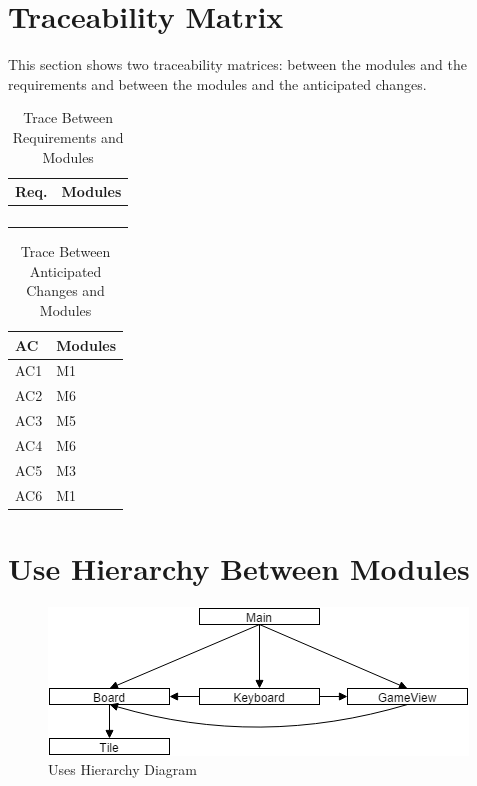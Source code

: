 \documentclass[12pt]{article}
\begin{document}
\section{Traceability Matrix}
This section shows two traceability matrices: between the modules and 
the 
requirements and between the modules and the anticipated changes. 
\smallskip
\begin{table}[!htbp]
	\centering
	\begin{tabular}{p{3cm}|p{9cm}}
		\textbf{Req.} & \textbf{Modules} \\\hline
		&  \\
		&  \\
		&  \\
		&  \\\hline
	\end{tabular}
	\caption{Trace Between Requirements and Modules}
	\label{Trace Between Requirements and Modules}
\end{table}
\begin{table}[!htbp]
	\centering
	\begin{tabular}{p{3cm}|p{9cm}}
		\textbf{AC} & \textbf{Modules} \\\hline
		AC1 & M1 \\ 
		AC2 &  M6\\  
		AC3 &  M5\\  
		AC4 &  M6\\ 
		AC5 & M3\\ 
		AC6 & M1\\ \hline
	\end{tabular}
	\caption{Trace Between Anticipated Changes and Modules}
	\label{Trace Between Anticipated Changes and Modules}
\end{table}
\newpage

\section{Use Hierarchy Between Modules}
\begin{figure}[!htbp]
	\includegraphics{uses}
	\centering
	\caption{Uses Hierarchy Diagram}
	\label{Uses Hierarchy Diagram}
\end{figure}
\end{document}
